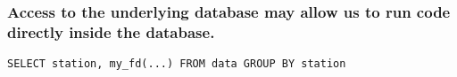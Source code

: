 \documentclass{beamer}
\begin{document}
\begin{frame}[fragile]


    \frametitle{Access to the underlying database may allow us to run code directly inside the
    database.}

\begin{verbatim}
SELECT station, my_fd(...) FROM data GROUP BY station
\end{verbatim}


%
%

\end{frame}
\end{document}
